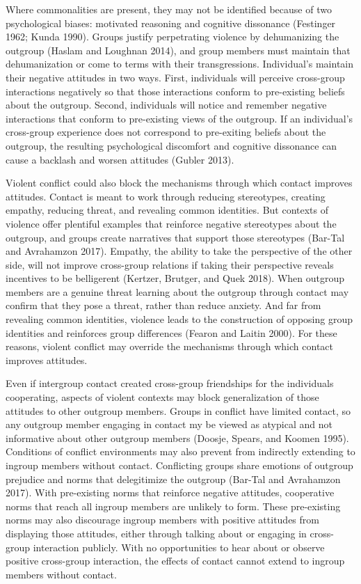 \documentclass[11pt]{article}
\begin{document}
Where commonalities are present, they may not be identified because of
two psychological biases: motivated reasoning and cognitive dissonance
(Festinger 1962; Kunda 1990). Groups justify perpetrating violence by
dehumanizing the outgroup (Haslam and Loughnan 2014), and group members
must maintain that dehumanization or come to terms with their
transgressions. Individual's maintain their negative attitudes in two
ways. First, individuals will perceive cross-group interactions
negatively so that those interactions conform to pre-existing beliefs
about the outgroup. Second, individuals will notice and remember
negative interactions that conform to pre-existing views of the
outgroup. If an individual's cross-group experience does not correspond
to pre-exiting beliefs about the outgroup, the resulting psychological
discomfort and cognitive dissonance can cause a backlash and worsen
attitudes (Gubler 2013).

Violent conflict could also block the mechanisms through which contact
improves attitudes. Contact is meant to work through reducing
stereotypes, creating empathy, reducing threat, and revealing common
identities. But contexts of violence offer plentiful examples that
reinforce negative stereotypes about the outgroup, and groups create
narratives that support those stereotypes (Bar-Tal and Avrahamzon 2017).
Empathy, the ability to take the perspective of the other side, will not
improve cross-group relations if taking their perspective reveals
incentives to be belligerent (Kertzer, Brutger, and Quek 2018). When
outgroup members are a genuine threat learning about the outgroup
through contact may confirm that they pose a threat, rather than reduce
anxiety. And far from revealing common identities, violence leads to the
construction of opposing group identities and reinforces group
differences (Fearon and Laitin 2000). For these reasons, violent
conflict may override the mechanisms through which contact improves
attitudes.

Even if intergroup contact created cross-group friendships for the
individuals cooperating, aspects of violent contexts may block
generalization of those attitudes to other outgroup members. Groups in
conflict have limited contact, so any outgroup member engaging in
contact my be viewed as atypical and not informative about other
outgroup members (Doosje, Spears, and Koomen 1995). Conditions of
conflict environments may also prevent from indirectly extending to
ingroup members without contact. Conflicting groups share emotions of
outgroup prejudice and norms that delegitimize the outgroup (Bar-Tal and
Avrahamzon 2017). With pre-existing norms that reinforce negative
attitudes, cooperative norms that reach all ingroup members are unlikely
to form. These pre-existing norms may also discourage ingroup members
with positive attitudes from displaying those attitudes, either through
talking about or engaging in cross-group interaction publicly. With no
opportunities to hear about or observe positive cross-group interaction,
the effects of contact cannot extend to ingroup members without contact.
\end{document}
